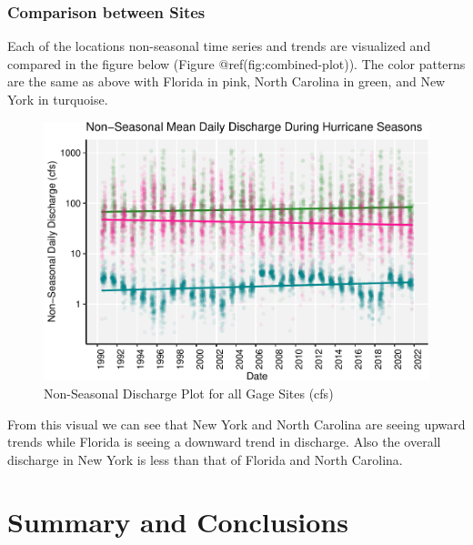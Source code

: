 \documentclass[
  12pt,
]{article}
\begin{document}
\hypertarget{comparison-between-sites}{%
\subsubsection{Comparison between
Sites}\label{comparison-between-sites}}

Each of the locations non-seasonal time series and trends are visualized
and compared in the figure below (Figure @ref(fig:combined-plot)). The
color patterns are the same as above with Florida in pink, North
Carolina in green, and New York in turquoise.

\begin{figure}

{\centering \includegraphics{BoosBrantleyHusted_ENV872_Project_files/figure-latex/combined-plot-1} 

}

\caption{Non-Seasonal Discharge Plot for all Gage Sites (cfs)}\label{fig:combined-plot}
\end{figure}

From this visual we can see that New York and North Carolina are seeing
upward trends while Florida is seeing a downward trend in discharge.
Also the overall discharge in New York is less than that of Florida and
North Carolina.

\newpage

\hypertarget{summary-and-conclusions}{%
\section{Summary and Conclusions}\label{summary-and-conclusions}}
\end{document}
